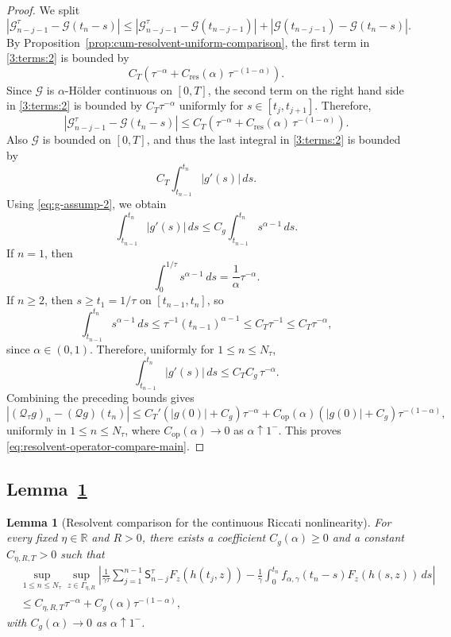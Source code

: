 \documentclass[letterpaper]{article}
\numberwithin{equation}{section}
\newtheorem{lemma}[theorem]{Lemma}
\theoremstyle{definition}
\theoremstyle{remark}
\newcommand{\R}{\mathbb{R}}
\begin{document}
\begin{proof}
We split
\[
  \left|\mathcal G_{n-j-1}^\tau-\mathcal G(t_n-s)\right|
  \le
  \left|\mathcal G_{n-j-1}^\tau-\mathcal G(t_{n-j-1})\right|
  +
  \left|\mathcal G(t_{n-j-1})-\mathcal G(t_n-s)\right|.
\]
By Proposition~\ref{prop:cum-resolvent-uniform-comparison}, the first term in \eqref{3:terms:2} is
bounded by
\[
  C_T\left(\tau^{-\alpha}+{C_{\mathrm{res}}(\alpha)}\,\tau^{-(1-\alpha)}\right).
\]
Since $\mathcal G$ is $\alpha$-H\"older continuous on $[0,T]$, the second term on the right hand side in \eqref{3:terms:2} is bounded
by $C_T\tau^{-\alpha}$ uniformly for $s\in[t_j,t_{j+1}]$. Therefore,
\[
  \left|\mathcal G_{n-j-1}^\tau-\mathcal G(t_n-s)\right|
  \le
  C_T\left(\tau^{-\alpha}+{C_{\mathrm{res}}(\alpha)}\,\tau^{-(1-\alpha)}\right).
\]
Also $\mathcal G$ is bounded on $[0,T]$, and thus the last integral in \eqref{3:terms:2} is bounded by
\[
  C_T\int_{t_{n-1}}^{t_n}|g'(s)|\,ds.
\]
Using \eqref{eq:g-assump-2}, we obtain
\[
  \int_{t_{n-1}}^{t_n}|g'(s)|\,ds
  \le
  C_g\int_{t_{n-1}}^{t_n}s^{\alpha-1}\,ds.
\]
If $n=1$, then
\[
  \int_{0}^{1/\tau}s^{\alpha-1}\,ds
  =\frac1\alpha\tau^{-\alpha}.
\]
If $n\ge2$, then $s\ge t_1=1/\tau$ on $[t_{n-1},t_n]$, so
\[
  \int_{t_{n-1}}^{t_n}s^{\alpha-1}\,ds
  \le
  \tau^{-1}(t_{n-1})^{\alpha-1}
  \le C_T\tau^{-1}
  \le C_T\tau^{-\alpha},
\]
since $\alpha\in(0,1)$. Therefore, uniformly for $1\le n\le N_\tau$,
\[
  \int_{t_{n-1}}^{t_n}|g'(s)|\,ds
  \le C_T C_g\,\tau^{-\alpha}.
\]
Combining the preceding bounds gives
\[
  \left|(\mathcal Q_\tau g)_n-(\mathcal Q g)(t_n)\right|
  \le
  C_T' \left(|g(0)|+C_g\right)\tau^{-\alpha}
  +
  C_{\mathrm{op}}(\alpha)\left(|g(0)|+C_g\right)\tau^{-(1-\alpha)},
\]
uniformly in $1\le n\le N_\tau$, where
$C_{\mathrm{op}}(\alpha)\to0$
as $\alpha\uparrow1^-$.
This proves \eqref{eq:resolvent-operator-compare-main}.
\end{proof}

\subsection{Lemma~\ref{lem:resolvent-gz-compare}}\label{app:proof-resolvent-gz-compare}

\begin{lemma}[Resolvent comparison for the continuous Riccati nonlinearity]
\label{lem:resolvent-gz-compare}
For every fixed $\eta\in\R$ and $R>0$, there exists a coefficient
$C_g(\alpha)\ge0$ and a constant $C_{\eta,R,T}>0$ such that
\begin{equation}\label{eq:resolvent-gz-compare-main}
\begin{aligned}
  &\sup_{1\le n\le N_\tau}\sup_{z\in\Gamma_{\eta,R}}
  \left|
    \frac{1}{\gamma\tau}\sum_{j=1}^{n-1}\mathsf S_{n-j}^\tau F_z(h(t_j,z))
    -
    \frac1\gamma\int_0^{t_n}f_{\alpha,\gamma}(t_n-s)F_z(h(s,z))\,ds
  \right|
  \\
  &\le
  C_{\eta,R,T}\tau^{-\alpha}+C_g(\alpha)\tau^{-(1-\alpha)},
\end{aligned}
\end{equation}
with $C_g(\alpha)\to0$ as $\alpha\uparrow1^-$.
\end{lemma}
\end{document}
